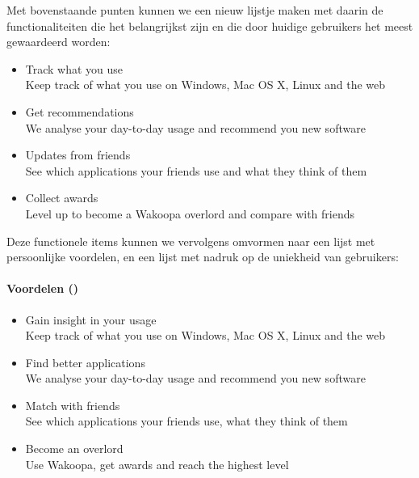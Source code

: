Met bovenstaande punten kunnen we een nieuw lijstje maken met daarin de functionaliteiten die het belangrijkst zijn en die door huidige gebruikers het meest gewaardeerd worden:
\begin{itemize}
    \item{Track what you use\\
      Keep track of what you use on Windows, Mac OS X, Linux and the web}

    \item{Get recommendations\\
      We analyse your day-to-day usage and recommend you new software}

    \item{Updates from friends\\
      See which applications your friends use and what they think of them}

    \item{Collect awards\\
      Level up to become a Wakoopa overlord and compare with friends}
\end{itemize}

Deze functionele items kunnen we vervolgens omvormen naar een lijst met persoonlijke voordelen, en een lijst met nadruk op de uniekheid van gebruikers:

\paragraph{Voordelen (\citet{Hoekman2008}) }
\begin{itemize}
    \item{Gain insight in your usage\\
      Keep track of what you use on Windows, Mac OS X, Linux and the web}

    \item{Find better applications\\
      We analyse your day-to-day usage and recommend you new software}

    \item{Match with friends\\
      See which applications your friends use, what they think of them}

    \item{Become an overlord\\
      Use Wakoopa, get awards and reach the highest level}
\end{itemize}
